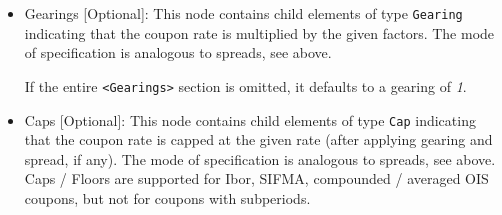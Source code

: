 \begin{itemize}
If the entire {\tt <Spreads>} section is omitted, it defaults to a spread of \emph{0\%}.

\item Gearings [Optional]: This node contains child elements of type \lstinline!Gearing! indicating that the coupon rate is
  multiplied by the given factors. The mode of specification is analogous to spreads, see above.

If the entire {\tt <Gearings>} section is omitted, it defaults to a gearing of \emph{1}.

\item Caps [Optional]: This node contains child elements of type \lstinline!Cap! indicating that the coupon rate is
  capped at the given rate (after applying gearing and spread, if any). The mode of specification is analogous to
  spreads, see above. Caps / Floors are supported for Ibor, SIFMA, compounded / averaged OIS coupons, but not for coupons
  with subperiods.


\end{itemize}
